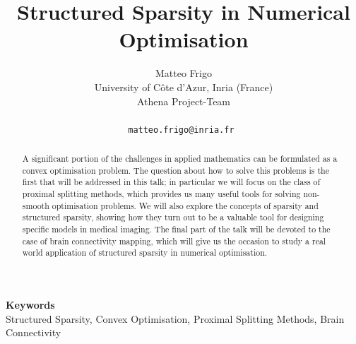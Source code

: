 \documentclass[a4paper]{article} %
\date{} %
\def\keywords#1{\begin{center}{\bf Keywords}\\{#1}\end{center}} %
\begin{document}
\title{Structured Sparsity in Numerical Optimisation}

\author{Matteo Frigo \\ %
       University of C\^ote d'Azur, Inria (France) \\
       Athena Project-Team \\ \\ %
       \tt{matteo.frigo@inria.fr} %
       }%


\maketitle

\thispagestyle{empty}




\begin{abstract}
A significant portion of the challenges in applied mathematics can be formulated as a convex optimisation problem. The question about how to solve this problems is the first that will be addressed in this talk; in particular we will focus on the class of proximal splitting methods, which provides us many useful tools for solving non-smooth optimisation problems. We will also explore the concepts of sparsity and structured sparsity, showing how they turn out to be a valuable tool for designing specific models in medical imaging. The final part of the talk will be devoted to the case of brain connectivity mapping, which will give us the occasion to study a real world application of structured sparsity in numerical optimisation.
\end{abstract}

\keywords{Structured Sparsity, Convex Optimisation, Proximal Splitting Methods, Brain Connectivity}

\end{document}
